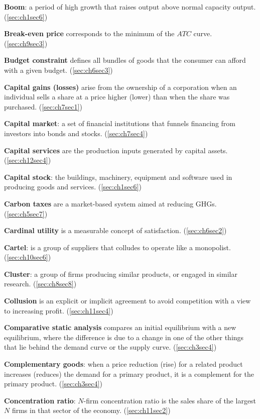 \textbf{Boom}: a period of high growth that raises output above normal capacity output. (\ref{sec:ch1sec6})

\textbf{Break-even price} corresponds to the minimum of the $ATC$ curve. (\ref{sec:ch9sec3})

\textbf{Budget constraint} defines all bundles of goods that the consumer can afford with a given budget. (\ref{sec:ch6sec3})

\textbf{Capital gains (losses)} arise from the ownership of a corporation when an individual sells a share at a price higher (lower) than when the share was purchased. (\ref{sec:ch7sec1})

\textbf{Capital market}: a set of financial institutions that funnels financing from investors into bonds and stocks. (\ref{sec:ch7sec4})

\textbf{Capital services} are the production inputs generated by capital assets. (\ref{sec:ch12sec4})

\textbf{Capital stock}: the buildings, machinery, equipment and software used in producing goods and services. (\ref{sec:ch1sec6})

\textbf{Carbon taxes} are a market-based system aimed at reducing GHGs. (\ref{sec:ch5sec7})

\textbf{Cardinal utility} is a measurable concept of satisfaction. (\ref{sec:ch6sec2})

\textbf{Cartel}: is a group of suppliers that colludes to operate like a monopolist. (\ref{sec:ch10sec6})

\textbf{Cluster}: a group of firms producing similar products, or engaged in similar research. (\ref{sec:ch8sec8})

\textbf{Collusion} is an explicit or implicit agreement to avoid competition with a view to increasing profit. (\ref{sec:ch11sec4})

\textbf{Comparative static analysis} compares an initial equilibrium with a new equilibrium, where the difference is due to a change in one of the other things that lie behind the demand curve or the supply curve. (\ref{sec:ch3sec4})

\textbf{Complementary goods}: when a price reduction (rise) for a related product increases (reduces) the demand for a primary product, it is a complement for the primary product. (\ref{sec:ch3sec4})

\textbf{Concentration ratio}: $N$-firm concentration ratio is the sales share of the largest $N$ firms in that sector of the economy. (\ref{sec:ch11sec2})


